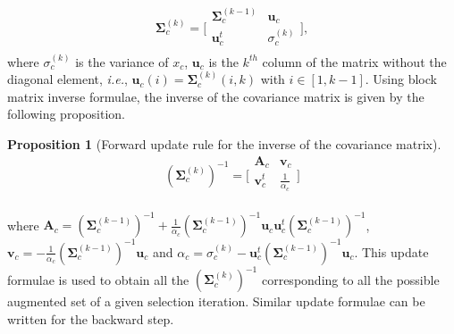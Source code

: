 \documentclass[journal,10pt]{IEEEtran}
\newtheorem{prop}{Proposition}
\begin{document}
        \begin{equation}\label{eq:cov}
            \boldsymbol{\Sigma}_c^{(k)} =
            \bigg[\begin{array}{cc}
            \boldsymbol{\Sigma}^{(k-1)}_c & \mathbf{u}_c      \\
            \mathbf{u}_c^t          & \sigma^{(k)}_c \\
            \end{array}\bigg],
        \end{equation}
        where  $\sigma^{(k)}_c$  is  the variance  of  $x_c$,
        $\mathbf{u}_c$ is  the $k^{th}$  column of the  matrix without
        the          diagonal           element,          \emph{i.e.},
        $\mathbf{u}_{c}(i) =  \boldsymbol{\Sigma}^{(k)}_{c}(i,k)$ with
        $i  \in [1,k-1]$.   Using block  matrix inverse  formulae, the
        inverse of  the covariance  matrix is  given by  the following
        proposition.
        \begin{prop}[Forward update rule for the inverse of the covariance matrix]
        \label{eq:update-inv}
        \begin{equation}\label{eq:cov:inv}
                (\boldsymbol{\Sigma}_c^{(k)})^{-1} =
                \bigg[\begin{array}{cc}
                \mathbf{A}_c & \mathbf{v}_c \\
                \mathbf{v}_c^t  & \frac{1}{\alpha_c} \\
                \end{array}\bigg]
            \end{equation}
        \end{prop}
        \noindent                                                where
        $\mathbf{A}_c     =     (\boldsymbol{\Sigma}^{(k-1)}_c)^{-1}     +
        \frac{1}{\alpha_c} (\boldsymbol{\Sigma}^{(k-1)}_c)^{-1} \mathbf{u}_c
        \mathbf{u}_c^t              (\boldsymbol{\Sigma}^{(k-1)}_c)^{-1}$,
        $\mathbf{v}_c           =           -           \frac{1}{\alpha_c}
        (\boldsymbol{\Sigma}^{(k-1)}_c)^{-1}       \mathbf{u}_c$       and
        $      \alpha_c      =      \sigma^{(k)}_c      -      \mathbf{u}_c^t
        (\boldsymbol{\Sigma}^{(k-1)}_c)^{-1}  \mathbf{u}_c$.  This  update
        formulae      is     used      to      obtain     all      the
        $(\boldsymbol{\Sigma}^{(k)}_c)^{-1}$  corresponding  to all  the
        possible augmented set of a given selection iteration. Similar
        update formulae can be written for the backward step.
\end{document}
